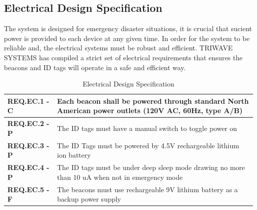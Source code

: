 \subsection{Electrical Design Specification}
\medskip
The system is designed for emergency disaster situations, it is crucial that sucient power is provided to each device at any given time. In order for the system to be reliable and, the electrical systems must be robust and efficient. TRIWAVE SYSTEMS has compiled a strict set of electrical requirements that ensures the beacons and ID tags will operate in a safe and efficient way.
\medskip
\bgroup
\def\arraystretch{1.5}
\begin{table}[H]
\centering
\begin{tabular}{ | m{3cm} | m{12.5cm} |}
\hline
\textbf{REQ.EC.1 - C} &  Each beacon shall be powered through standard North American power outlets (120V AC, 60Hz, type A/B)\\
\hline
\textbf{REQ.EC.2 - P} &  The ID tags must have a manual switch to toggle power on \\
\hline
\textbf{REQ.EC.3 - P} &  The ID Tags must be powered by 4.5V rechargeable lithium ion battery\\
\hline
\textbf{REQ.EC.4 - P} &  The ID tags must be under deep sleep mode drawing no more than 10 uA when not in emergency mode\\
\hline
\textbf{REQ.EC.5 - F} &  The beacons must use rechargeable 9V lithium battery as a backup power supply\\
\hline
\end{tabular}
\caption{Electrical Design Specification}
\end{table}








